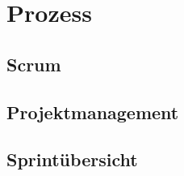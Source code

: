 \chapter{Prozess}
\label{ch:process}

\section{Scrum}
\label{sec:scrum}

\section{Projektmanagement}
\label{sec:projectmanagement}


\section{Sprintübersicht}
\label{sec:sprintoverview}

